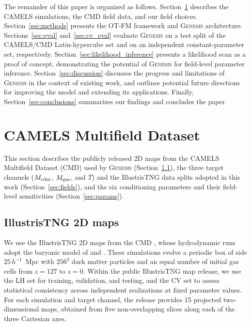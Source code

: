 \documentclass[usenatbib]{mnras}
\newcommand{\Mcdm}{M_{\rm cdm}}
\newcommand{\Mgas}{M_{\rm gas}}
\newcommand{\Tgas}{T}
\begin{document}
The remainder of this paper is organized as follows.
Section~\ref{sec:data} describes the CAMELS simulations, the CMD
field data, and our field choices.
Section~\ref{sec:methods} presents the OT-FM framework and \textsc{Genesis}
architecture.
Sections~\ref{sec:eval} and~\ref{sec:cv_eval} evaluate \textsc{Genesis}
on a test split of the CAMELS/CMD Latin-hypercube set and on an
independent constant-parameter set, respectively.
Section~\ref{sec:likelihood_inference} presents a likelihood scan as a proof of
concept, demonstrating the potential of \textsc{Genesis} for field-level
parameter inference.
Section~\ref{sec:discussion} discusses the progress and limitations of \textsc{Genesis} 
in the context of existing work, and outlines potential future directions for improving the model and extending its applications. 
Finally, Section~\ref{sec:conclusions} summarizes our findings and concludes the paper.

\section{CAMELS Multifield Dataset}
\label{sec:data}
This section describes the publicly released 2D maps from the CAMELS
Multifield Dataset (CMD) used by \textsc{Genesis}
(Section~\ref{sec:camels}), the three target channels
($\Mcdm$, $\Mgas$, and $\Tgas$) and the IllustrisTNG data splits
adopted in this work (Section~\ref{sec:fields}), and the six
conditioning parameters and their field-level sensitivities
(Section~\ref{sec:params}).

\subsection{IllustrisTNG 2D maps}
\label{sec:camels}
We use the IllustrisTNG 2D maps from the CMD
\citep{Villaescusa2022}, whose hydrodynamic runs adopt the baryonic
model of \citet{Weinberger2017} and \citet{Pillepich2018IllustrisTNG}.
These simulations evolve a periodic box of side
$25\,h^{-1}$~Mpc with $256^3$ dark matter particles and an equal
number of initial gas cells from $z=127$ to $z=0$.
Within the public IllustrisTNG map release, we use the LH set for
training, validation, and testing, and the CV set to assess
statistical consistency across independent realizations at fixed
parameter values. For each simulation and target channel, the release
provides 15 projected two-dimensional maps, obtained from five
non-overlapping slices along each of the three Cartesian axes.
\end{document}
